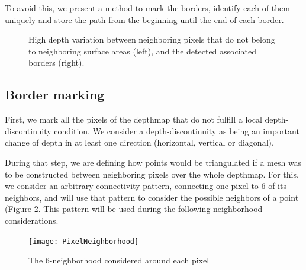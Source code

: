 \documentclass[11pt,fleqn]{book} %
\begin{document}
To avoid this, we present a method to mark the borders, identify each of them uniquely and store the path from the beginning until the end of each border.

\begin{figure}
\centering
{}
\caption{High depth variation between neighboring pixels that do not belong to neighboring surface areas (left), and the detected associated borders (right).}
\label{fig:depth_discontinuity}
\end{figure}

\subsection{Border marking}
First, we mark all the pixels of the depthmap that do not fulfill a local depth-discontinuity condition. We consider a depth-discontinuity as being an important change of depth in at least one direction (horizontal, vertical or diagonal).

During that step, we are defining how points would be triangulated if a mesh was to be constructed between neighboring pixels over the whole depthmap. For this, we consider an arbitrary connectivity pattern, connecting one pixel to 6 of its neighbors, and will use that pattern to consider the possible neighbors of a point (Figure \ref{fig:pixel_neighborhood}. This pattern will be used during the following neighborhood considerations.

\begin{figure}[ht]
\centering\texttt{[image: PixelNeighborhood]}
\caption{The 6-neighborhood considered around each pixel}
\label{fig:pixel_neighborhood}
\end{figure}
\end{document}
